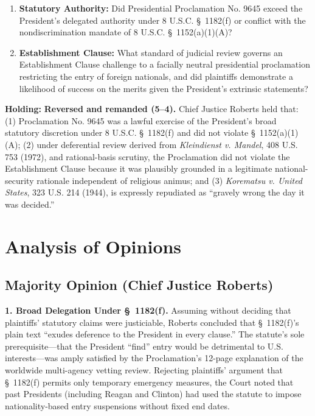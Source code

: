 \documentclass[12pt]{article}
\begin{document}
\begin{enumerate}
  \item \textbf{Statutory Authority:} Did Presidential Proclamation No. 9645 exceed the President's delegated authority under 8 U.S.C. \S~1182(f) or conflict with the nondiscrimination mandate of 8 U.S.C. \S~1152(a)(1)(A)?
  \item \textbf{Establishment Clause:} What standard of judicial review governs an Establishment Clause challenge to a facially neutral presidential proclamation restricting the entry of foreign nationals, and did plaintiffs demonstrate a likelihood of success on the merits given the President's extrinsic statements?
\end{enumerate}

\textbf{Holding:} \textbf{Reversed and remanded (5--4).} Chief Justice Roberts held that: (1) Proclamation No. 9645 was a lawful exercise of the President's broad statutory discretion under 8 U.S.C. \S~1182(f) and did not violate \S~1152(a)(1)(A); (2) under deferential review derived from \textit{Kleindienst v. Mandel}, 408 U.S. 753 (1972), and rational-basis scrutiny, the Proclamation did not violate the Establishment Clause because it was plausibly grounded in a legitimate national-security rationale independent of religious animus; and (3) \textit{Korematsu v. United States}, 323 U.S. 214 (1944), is expressly repudiated as ``gravely wrong the day it was decided.''

\section{Analysis of Opinions}
\subsection{Majority Opinion (Chief Justice Roberts)}

\textbf{1. Broad Delegation Under \S~1182(f).} Assuming without deciding that plaintiffs' statutory claims were justiciable, Roberts concluded that \S~1182(f)'s plain text ``exudes deference to the President in every clause.'' The statute's sole prerequisite---that the President ``find'' entry would be detrimental to U.S. interests---was amply satisfied by the Proclamation's 12-page explanation of the worldwide multi-agency vetting review. Rejecting plaintiffs' argument that \S~1182(f) permits only temporary emergency measures, the Court noted that past Presidents (including Reagan and Clinton) had used the statute to impose nationality-based entry suspensions without fixed end dates.
\end{document}
